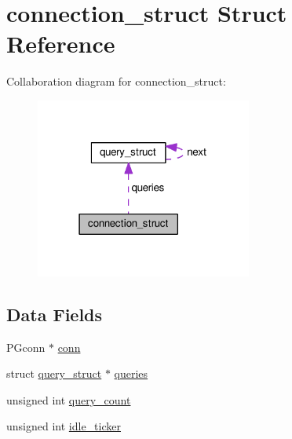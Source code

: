 \hypertarget{structconnection__struct}{\section{connection\-\_\-struct Struct Reference}
\label{structconnection__struct}
}


Collaboration diagram for connection\-\_\-struct\-:
\nopagebreak
\begin{figure}[H]
\begin{center}
\leavevmode
\includegraphics[width=202pt]{structconnection__struct__coll__graph}
\end{center}
\end{figure}
\subsection*{Data Fields}
\begin{DoxyCompactItemize}
\item 
P\-Gconn $\ast$ \hyperlink{structconnection__struct_af4516154f33e07be1eadff88fab71465}{conn}
\item 
struct \hyperlink{structquery__struct}{query\-\_\-struct} $\ast$ \hyperlink{structconnection__struct_ae8bf023f24dae989954803b34f8346f6}{queries}
\item 
unsigned int \hyperlink{structconnection__struct_a9d003902114bc45d2d33eb953579673a}{query\-\_\-count}
\item 
unsigned int \hyperlink{structconnection__struct_a2e4c5444712d727aaeb1050a4c734d4f}{idle\-\_\-ticker}
\end{DoxyCompactItemize}


